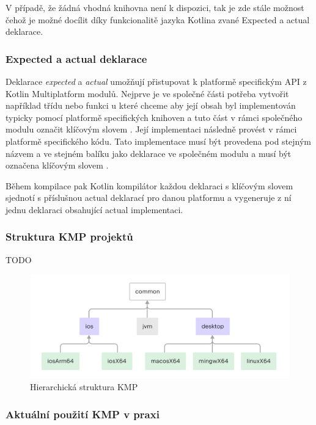 V případě, že žádná vhodná knihovna není k dispozici, tak je zde stále možnost čehož je možné docílit díky funkcionalitě jazyka Kotlina
zvané Expected a actual deklarace.

\subsubsection*{Expected a actual deklarace}\label{expectActual}
Deklarace \textit{expected} a \textit{actual} umožňují přistupovat k platformě specifickým API z Kotlin Multiplatform modulů. \cite{KMPExpectActual}
Nejprve je ve společné části potřeba vytvořit například třídu nebo funkci u které chceme aby její obsah byl implementován typicky pomocí
platformě specifických knihoven a tuto část v rámci společného modulu označit klíčovým slovem . \cite{KMPExpectActual} Její implementaci následně provést v rámci
platformě specifického kódu. Tato implementace musí být provedena pod stejným názvem a ve stejném balíku jako deklarace ve společném modulu
a musí být označena klíčovým slovem . \cite{KMPExpectActual}

Během kompilace pak Kotlin kompilátor každou deklaraci s klíčovým slovem  sjednotí s příslušnou actual deklarací pro danou platformu
a vygeneruje z ní jednu deklaraci obsahující actual implementaci. \cite{KMPExpectActual}

\subsubsection*{Struktura KMP projektů}\label{projectStructure}
TODO


\begin{figure}[H]
  \centering
  \includegraphics[width=1\textwidth]{kotlin-multiplatform-hierarchical-structure.png}
  \caption{Hierarchická struktura KMP}
  \label{fig:KMP_struktura}
\end{figure}

\subsubsection*{Aktuální použití KMP v praxi} \label{kmpInPractise}

